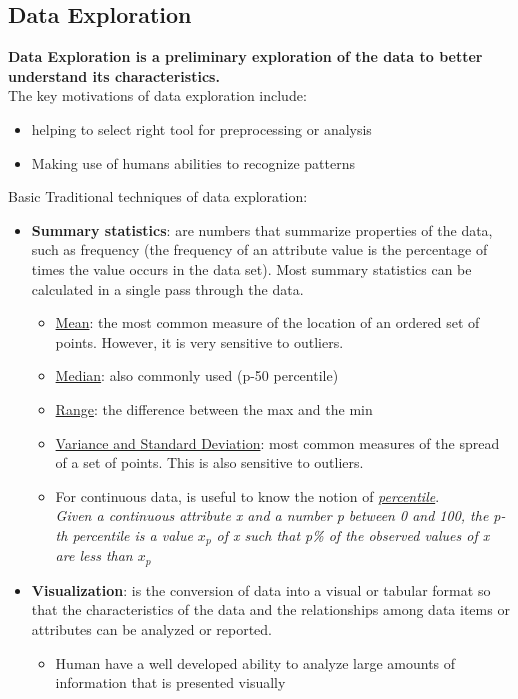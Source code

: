 \documentclass[10pt,a4paper]{article}
\begin{document}
\subsection{Data Exploration}
\textbf{Data Exploration is a preliminary exploration of the data to better understand its characteristics.}\\ The key motivations of data exploration include:
\begin{itemize}
	\item helping to select right tool for preprocessing or analysis
	 \item Making use of humans abilities to recognize patterns
\end{itemize}
Basic Traditional techniques of data exploration:
\begin{itemize}
	\item \textbf{Summary statistics}: are numbers that summarize properties of the data, such as frequency (the frequency of an attribute value is the percentage of times the value occurs in the data set). Most summary statistics can be calculated in a single pass through the data.
	\begin{itemize}
		\item \uline{Mean}: the most common measure of the location of an ordered set of points. However, it is very sensitive to outliers.
		\item \uline{Median}: also commonly used (p-50 percentile)
		\item \uline{Range}: the difference between the max and the min
		\item \uline{Variance and Standard Deviation}: most common measures of the spread of a set of points. This is also sensitive to outliers.
		\item For continuous data, is useful to know the notion of \uline{\textit{percentile}}. \\ 
	\textit{Given a continuous attribute x and a number p between 0 and 100, the p-th percentile is a value $x_p$ of x such that p\% of the observed values of x are less than $x_p$} 
\end{itemize}	
	\item \textbf{Visualization}: is the conversion of data into a visual or tabular format so that the characteristics of the data and the relationships among data items or attributes can be analyzed or reported. 
	\begin{itemize}
			\item Human have a well developed ability to analyze large amounts of information that is presented visually

\end{itemize}
\end{itemize}
\end{document}
